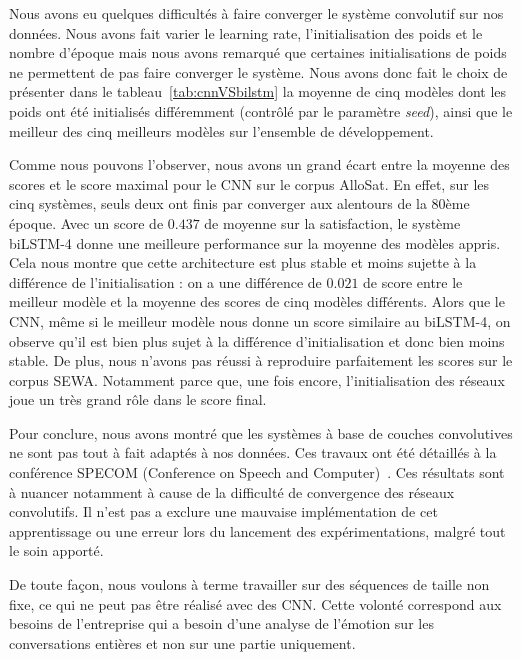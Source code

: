 Nous avons eu quelques difficultés à faire converger le système convolutif sur nos données. Nous avons fait varier le learning rate, l'initialisation des poids et le nombre d'époque mais nous avons remarqué que certaines initialisations de poids ne permettent de pas faire converger le système. Nous avons donc fait le choix de présenter dans le tableau~\ref{tab:cnnVSbilstm} la moyenne de cinq modèles dont les poids ont été initialisés différemment (contrôlé par le paramètre \textit{seed}), ainsi que le meilleur des cinq meilleurs modèles sur l'ensemble de développement.



Comme nous pouvons l'observer, nous avons un grand écart entre la moyenne des scores et le score maximal pour le CNN sur le corpus AlloSat. En effet, sur les cinq systèmes, seuls deux ont finis par converger aux alentours de la 80ème époque. Avec un score de $0.437$ de moyenne sur la satisfaction, le système biLSTM-4 donne une meilleure performance sur la moyenne des modèles appris. Cela nous montre que cette architecture est plus stable et moins sujette à la différence de l'initialisation : on a une différence de $0.021$ de score entre le meilleur modèle et la moyenne des scores de cinq modèles différents. Alors que le CNN, même si le meilleur modèle nous donne un score similaire au biLSTM-4, on observe qu'il est bien plus sujet à la différence d'initialisation et donc bien moins stable. De plus, nous n'avons pas réussi à reproduire parfaitement les scores sur le corpus SEWA. Notamment parce que, une fois encore, l'initialisation des réseaux joue un très grand rôle dans le score final.

Pour conclure, nous avons montré que les systèmes à base de couches convolutives ne sont pas tout à fait adaptés à nos données. Ces travaux ont été détaillés à la conférence SPECOM (Conference on Speech and Computer)~\cite{Macary2020convorrec}. Ces résultats sont à nuancer notamment à cause de la difficulté de convergence des réseaux convolutifs. Il n'est pas a exclure une mauvaise implémentation de cet apprentissage ou une erreur lors du lancement des expérimentations, malgré tout le soin apporté.

De toute façon, nous voulons à terme travailler sur des séquences de taille non fixe, ce qui ne peut pas être réalisé avec des CNN. Cette volonté correspond aux besoins de l'entreprise qui a besoin d'une analyse de l'émotion sur les conversations entières et non sur une partie uniquement.

